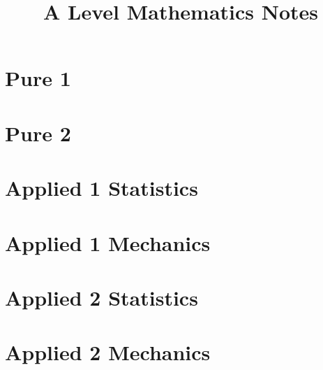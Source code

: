 \documentclass[oneside,fleqn,11pt]{book}
\title{A Level Mathematics Notes}
\begin{document}
\everymath{\displaystyle}
\maketitle
\tableofcontents

\part{Pure 1}
\setcounter{chapter}{0}


\part{Pure 2}
\setcounter{chapter}{0}


\part{Applied 1 Statistics}
\setcounter{chapter}{0}


\part{Applied 1 Mechanics}
\setcounter{chapter}{7}


\part{Applied 2 Statistics}
\setcounter{chapter}{0}


\part{Applied 2 Mechanics}
\setcounter{chapter}{3}

\end{document}
